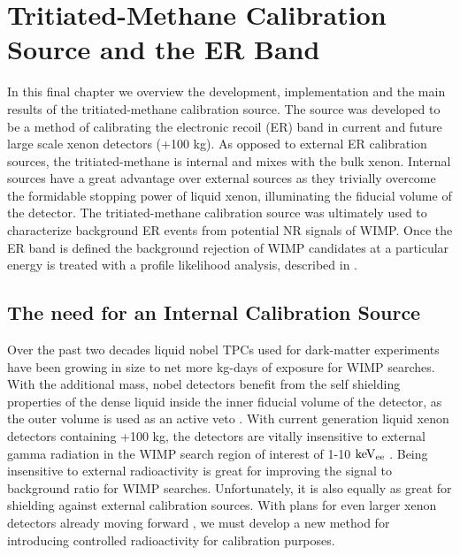 \renewcommand{\thechapter}{7}

\chapter{Tritiated-Methane Calibration Source and the ER Band}
\label{Ch:T}

In this final chapter we overview the development, implementation and the main results of the tritiated-methane calibration source. The source was developed to be a method of calibrating the electronic recoil (ER) band in current and future large scale xenon detectors (+100 kg). As opposed to external ER calibration sources, the tritiated-methane is internal and mixes with the bulk xenon. Internal sources have a great advantage over external sources as they trivially overcome the formidable stopping power of liquid xenon, illuminating the fiducial volume of the detector. The tritiated-methane calibration source was ultimately used to characterize background ER events from potential NR signals of WIMP. Once the ER band is defined the background rejection of WIMP candidates at a particular energy is treated with a profile likelihood analysis, described in \cite{LUX_PRL}.

\section{The need for an Internal Calibration Source} %

Over the past two decades liquid nobel TPCs used for dark-matter experiments have been growing in size to net more kg-days of exposure for WIMP searches. With the additional mass, nobel detectors benefit from the self shielding properties of the dense liquid inside the inner fiducial volume of the detector, as the outer volume is used as an active veto \cite{Aprile_LXe_overview}. With current generation liquid xenon detectors containing +100 kg, the detectors are vitally insensitive to external gamma radiation in the WIMP search region of interest of 1-10 $\rm keV_{ee}$ \cite{LUX_BG} \cite{Xenon100} \cite{PandaX} \cite{XMass}. Being insensitive to external radioactivity is great for improving the signal to background ratio for WIMP searches. Unfortunately, it is also equally as great for shielding against external calibration sources. With plans for even larger xenon detectors already moving forward \cite{LZ} \cite{Xenon1T}, we must develop a new method for introducing controlled radioactivity for calibration purposes.

